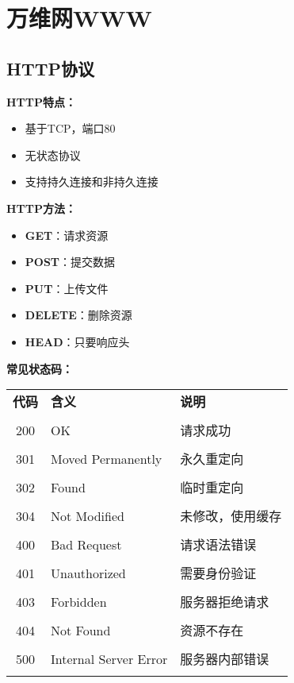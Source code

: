 \documentclass[lang=cn,newtx,10pt,scheme=chinese]{../../elegantbook}
\begin{document}
\section{万维网WWW}

\subsection{HTTP协议}

\textbf{HTTP特点：}
\begin{itemize}
  \item 基于TCP，端口80
  \item 无状态协议
  \item 支持持久连接和非持久连接
\end{itemize}

\textbf{HTTP方法：}
\begin{itemize}
  \item \textbf{GET}：请求资源
  \item \textbf{POST}：提交数据
  \item \textbf{PUT}：上传文件
  \item \textbf{DELETE}：删除资源
  \item \textbf{HEAD}：只要响应头
\end{itemize}

\textbf{常见状态码：}
\begin{longtable}{@{}clp{6cm}@{}}
\toprule
\textbf{代码} & \textbf{含义} & \textbf{说明} \\\\ \midrule
\endhead

200 & OK & 请求成功 \\\\
301 & Moved Permanently & 永久重定向 \\\\
302 & Found & 临时重定向 \\\\
304 & Not Modified & 未修改，使用缓存 \\\\
400 & Bad Request & 请求语法错误 \\\\
401 & Unauthorized & 需要身份验证 \\\\
403 & Forbidden & 服务器拒绝请求 \\\\
404 & Not Found & 资源不存在 \\\\
500 & Internal Server Error & 服务器内部错误 \\\\

\bottomrule
\end{longtable}
\end{document}
